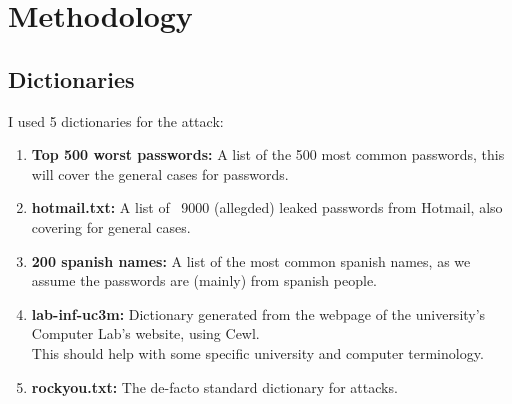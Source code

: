 \section{Methodology}

\subsection{Dictionaries}
I used 5 dictionaries for the attack:
\begin{enumerate}
    \item \textbf{Top 500 worst passwords:} A list of the 500 most common passwords, this will cover the general cases for passwords.
    \item \textbf{hotmail.txt:} A list of ~9000 (allegded) leaked passwords from Hotmail, also covering for general cases.
    \item \textbf{200 spanish names:} A list of the most common spanish names, as we assume the passwords are (mainly) from spanish people.
    \item \textbf{lab-inf-uc3m:} Dictionary generated from the webpage of the university's Computer Lab's website, using Cewl.\\
    This should help with some specific university and computer terminology.
    \item \textbf{rockyou.txt:} The de-facto standard dictionary for attacks.
\end{enumerate}

